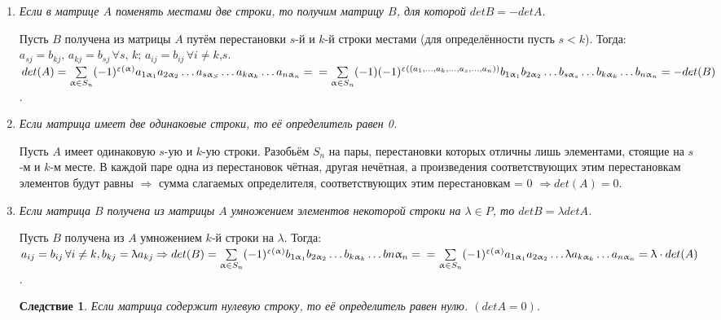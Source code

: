 \begin{enumerate}
	\item \textit{Если в матрице $A$ поменять местами две строки, то получим матрицу $B$, для которой $det B = -det A$.}
	\begin{Proof}
		Пусть $B$ получена из матрицы $A$ путём перестановки $s$-й и $k$-й строки местами (для
		определённости пусть $s < k$). Тогда: $a_{sj} = b_{kj},\, a_{kj} = b_{sj} \, \forall s,\, k;\,a_{ij} = b_{ij} \, \forall i \not= k$,$s$.\\
		$det(A) = \sum\limits_{\alpha \in S_n}(-1)^{\upvarepsilon(\alpha)}a_{1\alpha_1}a_{2\alpha_2}\dots a_{s\alpha_S}\dots a_{k\alpha_k}\dots a_{n\alpha_n} = \\
		=\sum\limits_{\alpha \in S_n}(-1)(-1)^{\upvarepsilon((a_1,\dots,a_k,\dots,a_s,\dots,a_n))} b_{1\alpha_1}b_{2\alpha_2}\dots b_{s\alpha_s}\dots b_{k\alpha_k} \dots b_{n\alpha_n} = -det(B)$.
	\end{Proof}
	\item \textit{Если матрица имеет две одинаковые строки, то её определитель равен 0.}
	\begin{Proof}
		Пусть $A$ имеет одинаковую $s$-ую и $k$-ую строки. Разобьём $S_n$ на пары, перестановки которых
		отличны лишь элементами, стоящие на $s$-м и $k$-м месте. В каждой паре одна из перестановок
		чётная, другая нечётная, а произведения соответствующих этим перестановкам элементов будут
		равны $\Rightarrow$ сумма слагаемых определителя, соответствующих этим перестановкам = 0 
		$\Rightarrow det(A) = 0$.
	\end{Proof}
	\item \textit{Если матрица $B$ получена из матрицы $A$ умножением элементов некоторой строки на $\lambda \in P$, то $det B = \lambda det A$.}
	\begin{Proof}
		Пусть $B$ получена из $A$ умножением $k$-й строки на $\lambda$. Тогда:\\
		$a_{ij} = b_{ij} \, \forall i \not= k, 
		b_{kj} = \lambda a_{kj} \Rightarrow det(B) = \sum\limits_{\alpha \in S_n}(-1)^{\upvarepsilon(\alpha)}b_{1\alpha_1}b_{2\alpha_2}\dots b_{k\alpha_k}\dots b{n\alpha_n} = \\
		=\sum\limits_{\alpha \in S_n}(-1)^{\upvarepsilon(\alpha)}a_{1\alpha_1}a_{2\alpha_2}\dots \lambda a_{k\alpha_k}\dots a_{n\alpha_n} = \lambda \cdot det(A)$.
	\end{Proof}
	\newtheorem*{t3_11}{Следствие}
	\begin{t3_11}
		\textit{Если матрица содержит нулевую строку, то её определитель равен нулю. $(detA = 0)$.}

\end{t3_11}
\end{enumerate}
